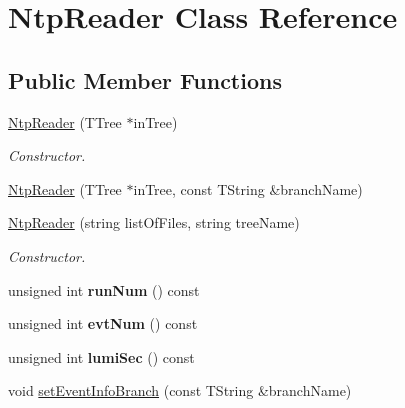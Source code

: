 \hypertarget{classNtpReader}{\section{Ntp\-Reader Class Reference}
\label{classNtpReader}
}
\subsection*{Public Member Functions}
\begin{DoxyCompactItemize}
\item 
\hypertarget{classNtpReader_af11ecbda21ac8dd55e71103f22ace772}{\hyperlink{classNtpReader_af11ecbda21ac8dd55e71103f22ace772}{Ntp\-Reader} (T\-Tree $\ast$in\-Tree)}\label{classNtpReader_af11ecbda21ac8dd55e71103f22ace772}

\begin{DoxyCompactList}\small\item\em Constructor. \end{DoxyCompactList}\item 
\hyperlink{classNtpReader_a31e2f7a7d23d553bc219e11f2e0c8c43}{Ntp\-Reader} (T\-Tree $\ast$in\-Tree, const T\-String \&branch\-Name)
\item 
\hypertarget{classNtpReader_a562709cebd6681f242e3d61d45a4b10c}{\hyperlink{classNtpReader_a562709cebd6681f242e3d61d45a4b10c}{Ntp\-Reader} (string list\-Of\-Files, string tree\-Name)}\label{classNtpReader_a562709cebd6681f242e3d61d45a4b10c}

\begin{DoxyCompactList}\small\item\em Constructor. \end{DoxyCompactList}\item 
\hypertarget{classNtpReader_aa5ea42a326bcfaa6024810d33249c300}{unsigned int {\bfseries run\-Num} () const }\label{classNtpReader_aa5ea42a326bcfaa6024810d33249c300}

\item 
\hypertarget{classNtpReader_a33826fc73883946d273d5fe0f40be06f}{unsigned int {\bfseries evt\-Num} () const }\label{classNtpReader_a33826fc73883946d273d5fe0f40be06f}

\item 
\hypertarget{classNtpReader_aed39639a2892ce1d7874e74e86f30525}{unsigned int {\bfseries lumi\-Sec} () const }\label{classNtpReader_aed39639a2892ce1d7874e74e86f30525}

\item 
\hypertarget{classNtpReader_acde9dee5818258f9ef2fe62cf5248582}{void \hyperlink{classNtpReader_acde9dee5818258f9ef2fe62cf5248582}{set\-Event\-Info\-Branch} (const T\-String \&branch\-Name)}\label{classNtpReader_acde9dee5818258f9ef2fe62cf5248582}


\end{DoxyCompactItemize}
